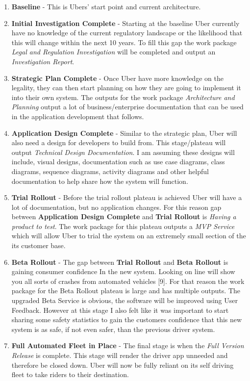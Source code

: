 \documentclass{article}
\begin{document}
    \begin{enumerate}
      \item \textbf{Baseline} - This is Ubers' start point and current architecture.
      \item \textbf{Initial Investigation Complete} - Starting at the baseline Uber currently have no knowledge of the current regulatory landscape or the
      likelihood that this will change within the next 10 years. To fill this gap the work package \textit{Legal and Regulation Investigation}
      will be completed and output an \textit{Investigation Report}.
      \item \textbf{Strategic Plan Complete} - Once Uber have more knowledge on the legality, they can then start planning on how
            they are going to implement it into their own system. The outputs for the work package \textit{Architecture and Planning}
            output a lot of business/enterprise documentation that can be used in the application development that follows.
      \item \textbf{Application Design Complete} - Similar to the strategic plan, Uber will also need a design for developers to build from. This stage/plateau
            will output \textit{Technical Design Documentation}. I am assuming these designs will include, visual designs, documentation such as use case diagrams,
            class diagrams, sequence diagrams, activity diagrams and other helpful documentation to help share how the system will function.
      \item \textbf{Trial Rollout} - Before the trial rollout plateau is achieved Uber will have a lot of documentation, but no application changes. For this reason 
            gap between \textbf{Application Design Complete} and \textbf{Trial Rollout} is \textit{Having a product to test}. The work package for this plateau outputs
            a \textit{MVP Service} which will allow Uber to trial the system on an extremely small section of the its customer base.
      \item \textbf{Beta Rollout} - The gap between \textbf{Trial Rollout} and \textbf{Beta Rollout} is gaining consumer confidence In
            the new system. Looking on line will show you all sorts of crashes from automated vehicles [9]. For that reason the work package for the Beta Rollout
            plateau is large and has multiple outputs. The upgraded Beta Service is obvious, the software will be improved using User Feedback. However at this 
            stage I also felt like it was important to start sharing some safety statistics to gain the customers confidence that this new system is as safe, if 
            not even safer, than the previous driver system.
      \item \textbf{Full Automated Fleet in Place} - The final stage is when the \textit{Full Version Release} is complete. This stage will render the driver app
            unneeded and therefore be closed down. Uber will now be fully reliant on its self driving fleet to take riders to their destination.
    \end{enumerate}
\end{document}
